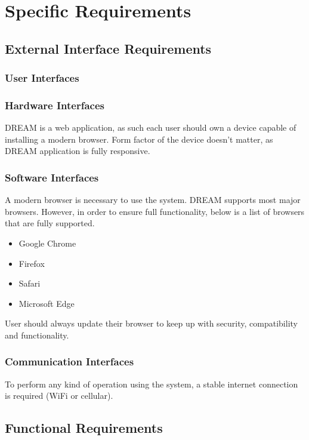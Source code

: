 \chapter{Specific Requirements}

\section{External Interface Requirements}

\subsection{User Interfaces}

\subsection{Hardware Interfaces}
DREAM is a web application, as such each user should own a device capable of installing a modern browser. Form factor of the device doesn't matter, as DREAM application is fully responsive.

\subsection{Software Interfaces}
A modern browser is necessary to use the system. DREAM supports most major browsers. However, in order to ensure full functionality, below is a list of browsers that are fully supported.
\begin{itemize}
    \setlength\itemsep{0em}
    \item Google Chrome
    \item Firefox
    \item Safari
    \item Microsoft Edge
\end{itemize}
User should always update their browser to keep up with security, compatibility and functionality.

\subsection{Communication Interfaces}
To perform any kind of operation using the system, a stable internet connection is required (WiFi or cellular).

\section{Functional Requirements}

